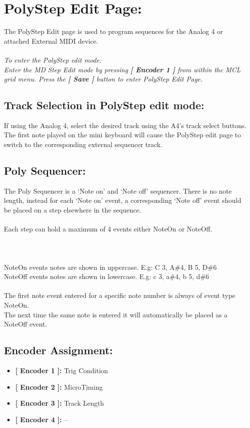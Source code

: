 \chapter{PolyStep Edit Page:}
The PolyStep Edit page is used to program sequences for the Analog 4 or attached External MIDI device.\\
\\
\textit{To enter the PolyStep edit mode:\\Enter the MD Step Edit mode by pressing \textbf{[ Encoder 1 ]} from within the MCL grid menu. Press the \textbf{[ Save ]} button to enter PolyStep Edit Page.}\\
\section{Track Selection in PolyStep edit mode:}
If using the Analog 4, select the desired track using the A4’s track select buttons. The first note played on the mini keyboard will cause the PolyStep edit page to switch to  the corresponding external sequencer track.
\section{Poly Sequencer: }
The Poly Sequencer is a ‘Note on’ and ‘Note off’ sequencer. There is no note length, instead for each ‘Note on’ event, a corresponding ‘Note off’ event should be placed on a step elsewhere in the sequence.\\
\\
Each step can hold a maximum of 4 events either NoteOn or NoteOff.\\\\
\\
\\
NoteOn events notes are shown in uppercase. E.g: C 3, A\#4, B 5, D\#6
\\NoteOff events notes are shown in lowercase. E.g: c 3, a\#4, b 5, d\#6
\\\\
The first note event entered for a specific note number is always of event type NoteOn.\\
The next time the same note is entered it will automatically be placed as a NoteOff event.
\section{Encoder Assignment:}
\begin{itemize}
	\item \textbf{[ Encoder 1 ]: } Trig Condition
	\item \textbf{[ Encoder 2 ]: } MicroTiming
	\item \textbf{[ Encoder 3 ]: } Track Length
	\item \textbf{[ Encoder 4 ]: } --
\end{itemize}

